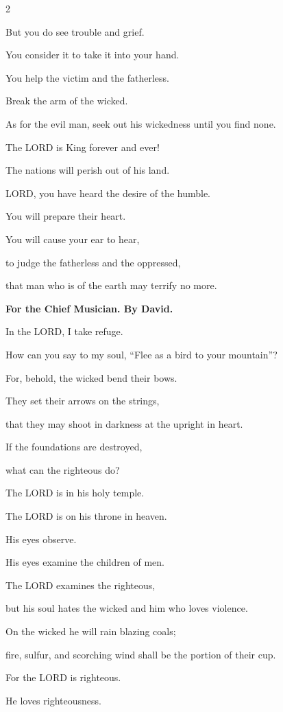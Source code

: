 \begin{multicols}{2}
	
	\myverse{}But you do see trouble and grief.
	
	You consider it to take it into your hand.
	
	You help the victim and the fatherless.
	
	
	\myverse{}Break the arm of the wicked.
	
	As for the evil man, seek out his wickedness until you find none.
	
	
	\myverse{}The LORD is King forever and ever!
	
	The nations will perish out of his land.
	
	
	\myverse{}LORD, you have heard the desire of the humble.
	
	You will prepare their heart.
	
	You will cause your ear to hear,
	
	
	\myverse{}to judge the fatherless and the oppressed,
	
	that man who is of the earth may terrify no more.
	
	
	\mychapter{}\textbf{For the Chief Musician. By David.}
	
	\quad \myverse*{}In the LORD, I take refuge.
	
	How can you say to my soul, “Flee as a bird to your mountain”?
	
	
	\myverse{}For, behold, the wicked bend their bows.
	
	They set their arrows on the strings,
	
	that they may shoot in darkness at the upright in heart.
	
	
	\myverse{}If the foundations are destroyed,
	
	what can the righteous do?
	
	
	\myverse{}The LORD is in his holy temple.
	
	The LORD is on his throne in heaven.
	
	His eyes observe.
	
	His eyes examine the children of men.
	
	
	\myverse{}The LORD examines the righteous,
	
	but his soul hates the wicked and him who loves violence.
	
	
	\myverse{}On the wicked he will rain blazing coals;
	
	fire, sulfur, and scorching wind shall be the portion of their cup.
	
	
	\myverse{}For the LORD is righteous.
	
	He loves righteousness.
	

\end{multicols}

